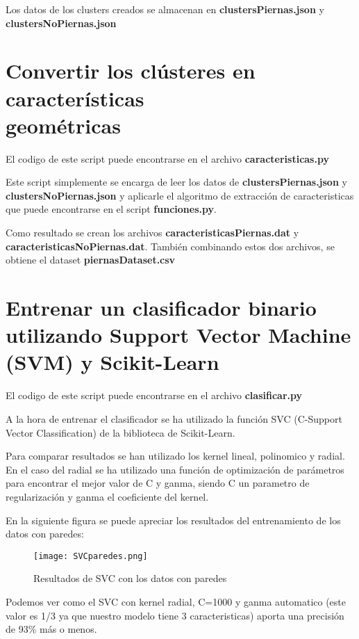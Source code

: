 Los datos de los clusters creados se almacenan en \textbf{clustersPiernas.json} y \textbf{clustersNoPiernas.json}

\section{Convertir los clústeres en características \\ geométricas}

El codigo de este script puede encontrarse en el archivo \textbf{caracteristicas.py}

Este script simplemente se encarga de leer los datos de \textbf{clustersPiernas.json} y \textbf{clustersNoPiernas.json} y aplicarle el algoritmo de extracción de caracteristicas que puede encontrarse en el script \textbf{funciones.py}.

Como resultado se crean los archivos \textbf{caracteristicasPiernas.dat} y \textbf{caracteristicasNoPiernas.dat}. También combinando estos dos archivos, se obtiene el dataset \textbf{piernasDataset.csv}

\newpage

\section{Entrenar un clasificador binario utilizando Support Vector Machine (SVM) y Scikit-Learn}

El codigo de este script puede encontrarse en el archivo \textbf{clasificar.py}

A la hora de entrenar el clasificador se ha utilizado la función SVC (C-Support Vector Classification) de la biblioteca de Scikit-Learn.

Para comparar resultados se han utilizado los kernel lineal, polinomico y radial. En el caso del radial se ha utilizado una función de optimización de parámetros para encontrar el mejor valor de C y ganma, siendo C un parametro de regularización y ganma el coeficiente del kernel.

En la siguiente figura se puede apreciar los resultados del entrenamiento de los datos con paredes:

\begin{figure}[H]
	\centering
	\texttt{[image: SVCparedes.png]}
	\caption{Resultados de SVC con los datos con paredes}
\end{figure}

Podemos ver como el SVC con kernel radial, C=1000 y ganma automatico (este valor es 1/3 ya que nuestro modelo tiene 3 caracteristicas) aporta una precisión de 93\% más o menos.

